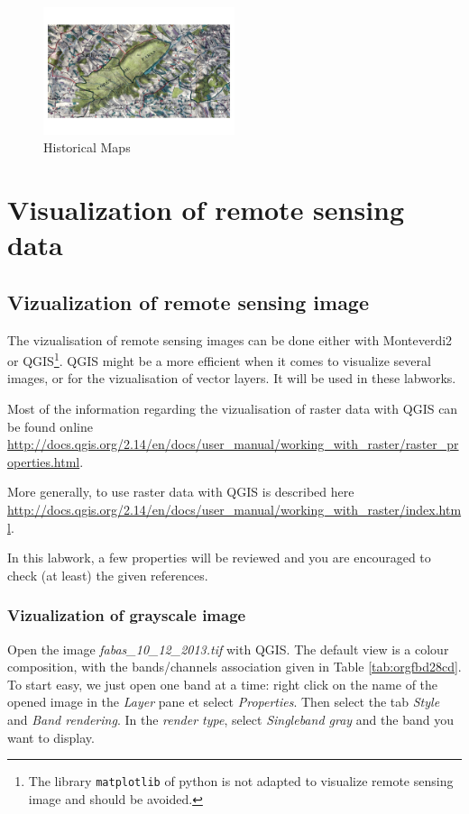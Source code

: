 \documentclass[a4paper,11pt,DIV=18]{scrartcl}
\begin{document}
\begin{figure}[htbp]
\centering
\includegraphics[width=0.5\textwidth]{figures/old_map.jpg}
\caption{\label{fig:orgfa6fb65}
Historical Maps}
\end{figure}

\section{Visualization of remote sensing data}
\label{sec:org8b24a4e}
\subsection{Vizualization of remote sensing image}
\label{sec:org9a3e7d8}
The vizualisation  of remote  sensing images can  be done  either with
Monteverdi2  or QGIS\footnote{The  library \texttt{matplotlib}  of  python is  not
adapted to  visualize remote  sensing image  and should  be avoided.}.
QGIS might  be a  more efficient  when it  comes to  visualize several
images, or for the vizualisation of  vector layers. It will be used in
these labworks.

Most of  the information  regarding the  vizualisation of  raster data
with         QGIS         can          be         found         online
\url{http://docs.qgis.org/2.14/en/docs/user\_manual/working\_with\_raster/raster\_properties.html}.

More  generally,  to use  raster  data  with  QGIS is  described  here
\url{http://docs.qgis.org/2.14/en/docs/user\_manual/working\_with\_raster/index.html}.

In  this labwork,  a  few  properties will  be  reviewed  and you  are
encouraged to check (at least) the given references.

\subsubsection{Vizualization of grayscale image}
\label{sec:orgd49cc9d}
Open the image  \emph{fabas\_10\_12\_2013.tif} with QGIS. The default  view is a
colour composition, with the bands/channels association given in Table
\ref{tab:orgfbd28cd}. To start easy, we just open  one band at a time: right click
on  the  name  of  the  opened  image in  the  \emph{Layer}  pane  et  select
\emph{Properties}.   Then select  the tab  \emph{Style} and  \emph{Band rendering}.  In the
\emph{render type}, select \emph{Singleband gray} and the band you want to display.
\end{document}
